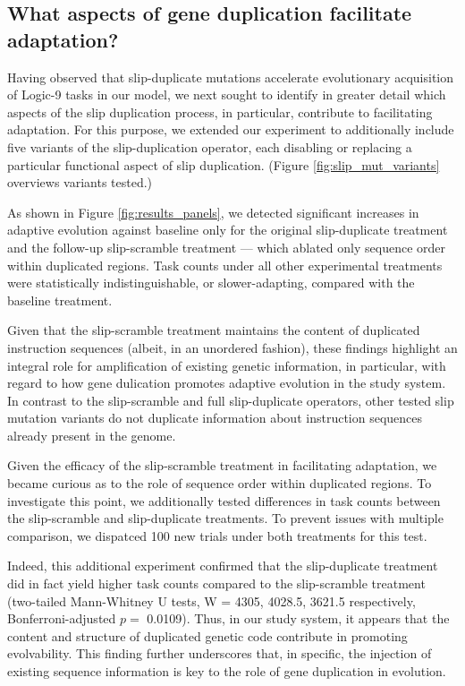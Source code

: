 \subsection{What aspects of gene duplication facilitate adaptation?}

Having observed that slip-duplicate mutations accelerate evolutionary acquisition of Logic-9 tasks in our model, we next sought to identify in greater detail which aspects of the slip duplication process, in particular, contribute to facilitating adaptation.
For this purpose, we extended our experiment to additionally include five variants of the slip-duplication operator, each disabling or replacing a particular functional aspect of slip duplication.
(Figure \ref{fig:slip_mut_variants} overviews variants tested.)

As shown in Figure \ref{fig:results_panels}, we detected significant increases in adaptive evolution against baseline only for the original slip-duplicate treatment and the follow-up slip-scramble treatment --- which ablated only sequence order within duplicated regions.
Task counts under all other experimental treatments were statistically indistinguishable, or slower-adapting, compared with the baseline treatment.

Given that the slip-scramble treatment maintains the content of duplicated instruction sequences (albeit, in an unordered fashion), these findings highlight an integral role for amplification of existing genetic information, in particular, with regard to how gene dulication promotes adaptive evolution in the study system.
In contrast to the slip-scramble and full slip-duplicate operators, other tested slip mutation variants do not duplicate information about instruction sequences already present in the genome.

Given the efficacy of the slip-scramble treatment in facilitating adaptation, we became curious as to the role of sequence order within duplicated regions.
To investigate this point, we additionally tested differences in task counts between the slip-scramble and slip-duplicate treatments.
To prevent issues with multiple comparison, we dispatced 100 new trials under both treatments for this test.

Indeed, this additional experiment confirmed that the slip-duplicate treatment did in fact yield higher task counts compared to the slip-scramble treatment (two-tailed Mann-Whitney U tests, W = 4305, 4028.5, 3621.5 respectively, Bonferroni-adjusted $p =$ 0.0109).
Thus, in our study system, it appears that the content and structure of duplicated genetic code contribute in promoting evolvability.
This finding further underscores that, in specific, the injection of existing sequence information is key to the role of gene duplication in evolution.

